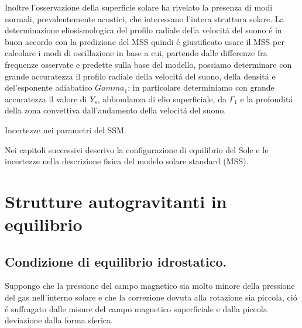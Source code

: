 \documentclass[../main.tex]{subfiles}
\begin{document}
\begin{workout}

Inoltre l'osservazione della superficie solare ha rivelato la presenza di modi normali, prevalentemente acustici, che interessano l'intera struttura solare. La determinazione eliosismologica del profilo radiale della velocit\'a del suono  \'e in buon accordo con la predizione del MSS quindi \'e giustificato usare il MSS per calcolare i modi di oscillazione in base a cui, partendo dalle differenze fra frequenze osservate e predette sulla base del modello, possiamo determinare con grande accuratezza il profilo radiale della velocit\'a del suono, della densit\'a e del'esponente adiabatico $Gamma_1$; in particolare determiniamo con grande accuratezza il valore di $Y_s$, abbondanza di elio superficiale, da $\Gamma_1$ e la profondit\'a della zona convettiva dall'andamento della velocit\'a del suono.

Incertezze nei parametri del SSM. 


\end{workout}



Nei capitoli successivi descrivo la configurazione di equilibrio del Sole e le incertezze nella descrizione fisica del modelo solare standard (MSS).


{\let\clearpage\relax\let\cleardoublepage\relax
\chapter{Strutture autogravitanti in equilibrio}
}

\section{Condizione di equilibrio idrostatico.}

Suppongo che la pressione del campo magnetico sia molto minore della pressione del gas nell'interno solare e che la correzione dovuta alla rotazione sia piccola, ci\'o \'e suffragato dalle misure del campo magnetico superficiale e dalla piccola deviazione dalla forma sferica.

\end{document}
